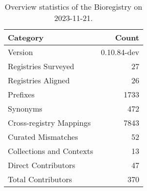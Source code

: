 \begin{table}
\caption{Overview statistics of the Bioregistry on 2023-11-21.}
\label{tab:bioregistry-summary}
\begin{tabular}{lr}
\toprule
Category & Count \\
\midrule
Version & 0.10.84-dev \\
Registries Surveyed & 27 \\
Registries Aligned & 26 \\
Prefixes & 1733 \\
Synonyms & 472 \\
Cross-registry Mappings & 7843 \\
Curated Mismatches & 52 \\
Collections and Contexts & 13 \\
Direct Contributors & 47 \\
Total Contributors & 370 \\
\bottomrule
\end{tabular}
\end{table}
